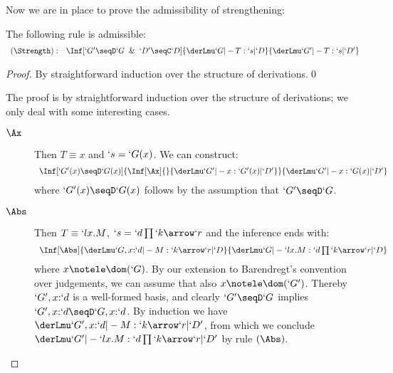 \documentclass{CSML}
\newcommand{\Comment}[1]{}
\begin{document}
Now we are in place to prove the admissibility of strengthening:

 \begin{lem} \label{lem:strengthening}
The following rule is admissible:
%
 \[ \begin{array}{rl}
(\Strength): &
\Inf	[ `G' \seqD `G \And `D' \seqC `D ]
	{ \derLmu `G |- T : `s | `D 
	}{ \derLmu `G' |- T : `s | `D' }
 \end{array} \] 
 \end{lem}

 \begin{proof}
By straightforward induction over the structure of derivations.\qed
{%
The proof is by straightforward induction over the structure of
derivations; we only deal with some interesting cases. 

 \begin{description}
 \item [$ \Ax $] 
Then $T\equiv x$ and $`s = `G(x)$. %
We can construct: %
%
 \[ \begin{array}{c}
\Inf	[ `G'(x) \seqD `G(x)]
	{\Inf	[\Ax]{}
{ \derLmu `G' |- x : `G'(x) | `D' } 
	}{ \derLmu `G' |- x : `G(x) | `D' }
 \end{array} \]
where $`G'(x) \seqD `G(x)$ follows by the assumption that $`G' \seqD `G$.

 \item [$ \Abs $] 
Then $T \equiv `lx.M$, $`s = `d\prod`k\arrow `r$ and the inference ends with:
%
 \[ \begin{array}{c}
\Inf	[\Abs]
	{\InfBox{ \derLmu `G,x{:}`d |- M : `k\arrow `r | `D } 
	}{\derLmu `G |- `lx.M : `d\prod `k\arrow `r | `D }
 \end{array} \]
where $x \notele \dom(`G)$. 
By our extension to Barendregt's convention over judgements, we can assume that also $x \notele \dom(`G')$. 
Thereby $`G', x{:}`d$ is a well-formed basis, and clearly $`G' \seqD `G$ implies $`G', x{:}`d \seqD `G, x{:}`d$. 
By induction we have $ \derLmu `G',x{:}`d |- M : `k\arrow `r | `D' $, from which we conclude $ \derLmu `G' |- `lx.M : `d\prod `k\arrow `r | `D' $ by rule $(\Abs)$.



\end{description}}
\end{proof}
\end{document}
